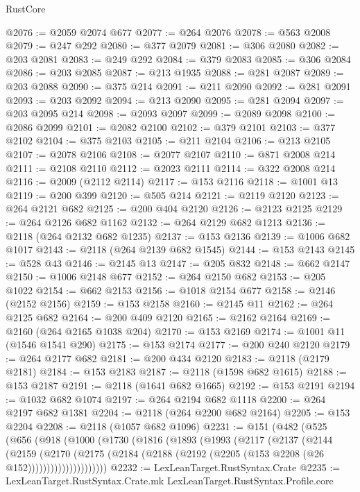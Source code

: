 \begin{lexlean}{RustCore}
\begin{coremodule}
@2076 := @2059 @2074 @677
@2077 := @264 @2076
@2078 := @563 @2008
@2079 := @247 @292
@2080 := @377 @2079
@2081 := @306 @2080
@2082 := @203 @2081
@2083 := @249 @292
@2084 := @379 @2083
@2085 := @306 @2084
@2086 := @203 @2085
@2087 := @213 @1935
@2088 := @281 @2087
@2089 := @203 @2088
@2090 := @375 @214
@2091 := @211 @2090
@2092 := @281 @2091
@2093 := @203 @2092
@2094 := @213 @2090
@2095 := @281 @2094
@2097 := @203 @2095 @214
@2098 := @2093 @2097
@2099 := @2089 @2098
@2100 := @2086 @2099
@2101 := @2082 @2100
@2102 := @379 @2101
@2103 := @377 @2102
@2104 := @375 @2103
@2105 := @211 @2104
@2106 := @213 @2105
@2107 := @2078 @2106
@2108 := @2077 @2107
@2110 := @871 @2008 @214
@2111 := @2108 @2110
@2112 := @2023 @2111
@2114 := @322 @2008 @214
@2116 := @2009 (@2112 @2114)
@2117 := @153 @2116
@2118 := @1001 @13
@2119 := @200 @399
@2120 := @505 @214
@2121 := @2119 @2120
@2123 := @264 @2121 @682
@2125 := @200 @404 @2120
@2126 := @2123 @2125
@2129 := @264 @2126 @682 @1162
@2132 := @264 @2129 @682 @1213
@2136 := @2118 (@264 @2132 @682 @1235)
@2137 := @153 @2136
@2139 := @1006 @682 @1017
@2143 := @2118 (@264 @2139 @682 @1545)
@2144 := @153 @2143
@2145 := @528 @43
@2146 := @2145 @13
@2147 := @205 @832
@2148 := @662 @2147
@2150 := @1006 @2148 @677
@2152 := @264 @2150 @682
@2153 := @205 @1022
@2154 := @662 @2153
@2156 := @1018 @2154 @677
@2158 := @2146 (@2152 @2156)
@2159 := @153 @2158
@2160 := @2145 @11
@2162 := @264 @2125 @682
@2164 := @200 @409 @2120
@2165 := @2162 @2164
@2169 := @2160 (@264 @2165 @1038 @204)
@2170 := @153 @2169
@2174 := @1001 @11 (@1546 @1541 @290)
@2175 := @153 @2174
@2177 := @200 @240 @2120
@2179 := @264 @2177 @682
@2181 := @200 @434 @2120
@2183 := @2118 (@2179 @2181)
@2184 := @153 @2183
@2187 := @2118 (@1598 @682 @1615)
@2188 := @153 @2187
@2191 := @2118 (@1641 @682 @1665)
@2192 := @153 @2191
@2194 := @1032 @682 @1074
@2197 := @264 @2194 @682 @1118
@2200 := @264 @2197 @682 @1381
@2204 := @2118 (@264 @2200 @682 @2164)
@2205 := @153 @2204
@2208 := @2118 (@1057 @682 @1096)
@2231 := @151
    (@482
      (@525
        (@656
          (@918
            (@1000
              (@1730
                (@1816
                  (@1893
                    (@1993
                      (@2117
                        (@2137
                          (@2144
                            (@2159
                              (@2170
                                (@2175
                                  (@2184
                                    (@2188 (@2192 (@2205 (@153 @2208 (@26 @152)))))))))))))))))))))
@2232 := LexLeanTarget.RustSyntax.Crate
@2235 := LexLeanTarget.RustSyntax.Crate.mk LexLeanTarget.RustSyntax.Profile.core

\end{coremodule}
\end{lexlean}
